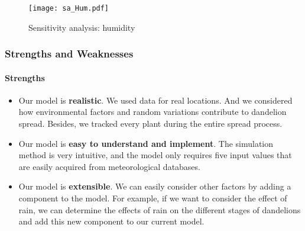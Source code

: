 \documentclass[12pt]{article}
\begin{document}
			\begin{figure}[htbp]
				\centering
				\texttt{[image: sa\_Hum.pdf]}
				\caption{Sensitivity analysis: humidity}
				\label{fig:saH}
			\end{figure}
			
			
			
		\subsubsection{Strengths and Weaknesses}
		
			\paragraph{Strengths}
			\vspace{-0.1cm}
			\begin{itemize}
				\vspace{-0.3cm}
				\item Our model is \textbf{realistic}.  We used data for real locations.  And we considered how environmental factors and random variations contribute to dandelion spread.  Besides, we tracked every plant during the entire spread process.  
				
				\vspace{-0.3cm}
				\item Our model is \textbf{easy to understand and implement}.  The simulation method is very intuitive, and the model only requires five input values that are easily acquired from meteorological databases.
				
				\vspace{-0.3cm}
				\item Our model is \textbf{extensible}.  We can easily consider other factors by adding a component to the model.  For example, if we want to consider the effect of rain, we can determine the effects of rain on the different stages of dandelions and add this new component to our current model.
			\end{itemize}
			
\end{document}
